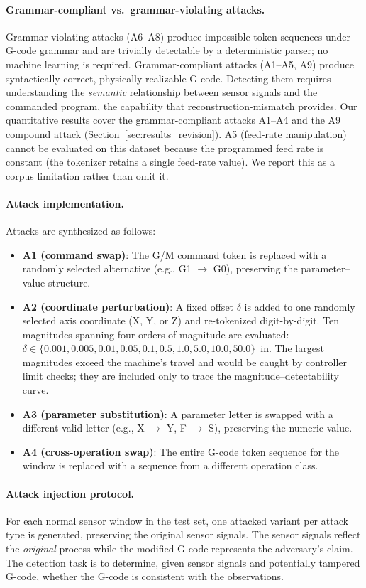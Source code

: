 \paragraph{Grammar-compliant vs.\ grammar-violating attacks.}
Grammar-violating attacks (A6--A8) produce impossible token sequences under G-code grammar and are trivially detectable by a deterministic parser; no machine learning is required.
Grammar-compliant attacks (A1--A5, A9) produce syntactically correct, physically realizable G-code.
Detecting them requires understanding the \emph{semantic} relationship between sensor signals and the commanded program, the capability that reconstruction-mismatch provides.
Our quantitative results cover the grammar-compliant attacks A1--A4 and the A9 compound attack (Section~\ref{sec:results_revision}).
A5 (feed-rate manipulation) cannot be evaluated on this dataset because the programmed feed rate is constant (the tokenizer retains a single feed-rate value).
We report this as a corpus limitation rather than omit it.

\paragraph{Attack implementation.}
Attacks are synthesized as follows:
\begin{itemize}
    \item \textbf{A1 (command swap)}: The G/M command token is replaced with a randomly selected alternative (e.g., G1 $\to$ G0), preserving the parameter--value structure.
    \item \textbf{A2 (coordinate perturbation)}: A fixed offset $\delta$ is added to one randomly selected axis coordinate (X, Y, or Z) and re-tokenized digit-by-digit. Ten magnitudes spanning four orders of magnitude are evaluated: $\delta \in \{0.001, 0.005, 0.01, 0.05, 0.1, 0.5, 1.0, 5.0, 10.0, 50.0\}$~in. The largest magnitudes exceed the machine's travel and would be caught by controller limit checks; they are included only to trace the magnitude--detectability curve.
    \item \textbf{A3 (parameter substitution)}: A parameter letter is swapped with a different valid letter (e.g., X $\to$ Y, F $\to$ S), preserving the numeric value.
    \item \textbf{A4 (cross-operation swap)}: The entire G-code token sequence for the window is replaced with a sequence from a different operation class.
\end{itemize}

\paragraph{Attack injection protocol.}
For each normal sensor window in the test set, one attacked variant per attack type is generated, preserving the original sensor signals.
The sensor signals reflect the \emph{original} process while the modified G-code represents the adversary's claim.
The detection task is to determine, given sensor signals and potentially tampered G-code, whether the G-code is consistent with the observations.

